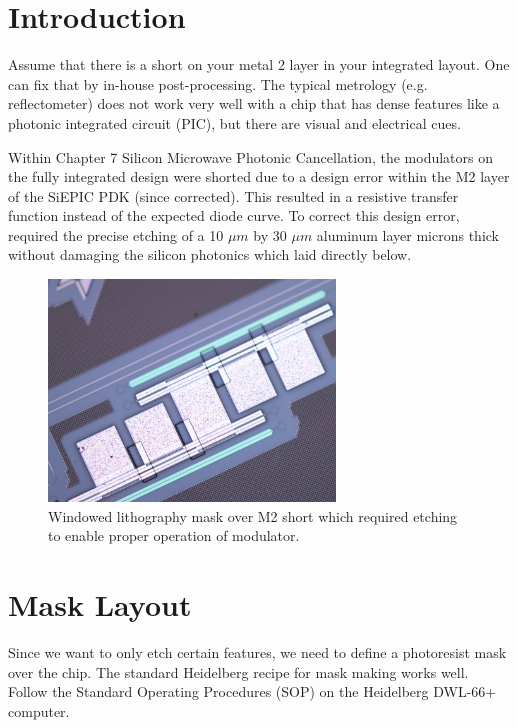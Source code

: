 \section{Introduction}
\qquad Assume that there is a short on your metal 2 layer in your integrated layout. One can fix that by in-house post-processing. The typical metrology (e.g. reflectometer) does not work very well with a chip that has dense features like a photonic integrated circuit (PIC), but there are visual and electrical cues. 

\qquad Within Chapter 7 Silicon Microwave Photonic Cancellation, the modulators on the fully integrated design were shorted due to a design error within the M2 layer of the SiEPIC PDK (since corrected). This resulted in a resistive transfer function instead of the expected diode curve. To correct this design error, required the precise etching of a 10 $\mu m$ by 30 $\mu m$ aluminum layer microns thick without damaging the silicon photonics which laid directly below. 

\begin{figure}[!htbp]
\centering
\includegraphics[width=3in]{./Figures/AppendixB/FigB1.PNG}
\caption{Windowed lithography mask over M2 short which required etching to enable proper operation of modulator.}
\label{FigAppB1}
\end{figure}

\section{Mask Layout}
\qquad Since we want to only etch certain features, we need to define a photoresist mask over the chip. The standard Heidelberg recipe for mask making works well. Follow the Standard Operating Procedures (SOP) on the Heidelberg DWL-66+ computer. 

